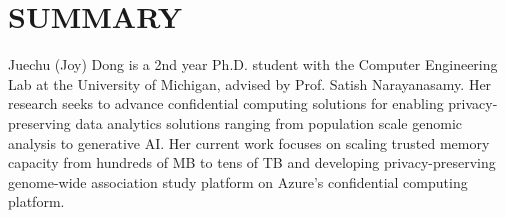 \section{SUMMARY}
Juechu (Joy) Dong is a 2nd year Ph.D. student with the Computer Engineering Lab at the University of Michigan, advised by Prof. Satish Narayanasamy. Her research seeks to advance confidential computing solutions for enabling privacy-preserving data analytics solutions ranging from population scale genomic analysis to generative AI. Her current work focuses on scaling trusted memory capacity from hundreds of MB to tens of TB and developing privacy-preserving genome-wide association study platform on Azure's confidential computing platform. 